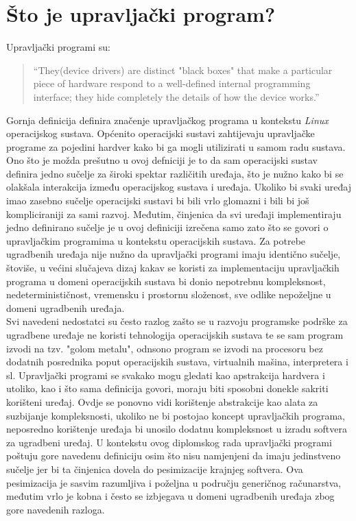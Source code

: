 \section{Što je upravljački program?}
Upravljački programi su\cite{linuxDeviceDrivers}:
\begin{quote}
    ``They(device drivers) are distinct "black boxes" that make a particular piece of hardware respond to a well-defined internal programming interface; they hide completely the details of how the device works.''
\end{quote}
Gornja definicija definira značenje upravljačkog programa u kontekstu \textit{Linux} operacijskog sustava. Općenito operacijski sustavi zahtijevaju upravljačke programe za pojedini hardver kako bi ga mogli utilizirati u samom radu sustava. Ono što je možda prešutno u ovoj defniciji je to da sam operacijski sustav definira jedno sučelje za široki spektar različitih uređaja, što je nužno kako bi se olakšala interakcija između operacijskog sustava i uređaja. Ukoliko bi svaki uređaj imao zasebno sučelje operacijski sustavi bi bili vrlo glomazni i bili bi još kompliciraniji za sami razvoj. Međutim, činjenica da svi uređaji implementiraju jedno definirano sučelje je u ovoj definiciji izrečena samo zato što se govori o upravljačkim programima u kontekstu operacijskih sustava. Za potrebe ugradbenih uređaja nije nužno da upravljački programi imaju identično sučelje, štoviše, u većini slučajeva dizaj kakav se koristi za implementaciju upravljačkih programa u domeni operacijskih sustava bi donio nepotrebnu kompleksnost, nedeterminističnost, vremensku i prostornu složenost, sve odlike nepoželjne u domeni ugradbenih uređaja. \\
Svi navedeni nedostatci su često razlog zašto se u razvoju programske podrške za ugradbene uređaje ne koristi tehnologija operacijskih sustava te se sam program izvodi na tzv. "golom metalu", odnsono program se izvodi na procesoru bez dodatnih posrednika poput operacijskih sustava, virtualnih mašina, interpretera i sl. Upravljački programi se svakako mogu gledati kao apstrakcija hardvera i utoliko, kao i što sama definicija govori, moraju biti sposobni donekle sakriti korišteni uređaj. Ovdje se ponovno vidi korištenje abstrakcije kao alata za suzbijanje kompleksnosti, ukoliko ne bi postojao koncept upravljačkih programa, neposredno korištenje uređaja bi unosilo dodatnu kompleksnost u izradu softvera za ugradbeni uređaj. U kontekstu ovog diplomskog rada upravljački programi poštuju gore navedenu definiciju osim što nisu namjenjeni da imaju jedinstveno sučelje jer bi ta činjenica dovela do pesimizacije krajnjeg softvera. Ova pesimizacija je sasvim razumljiva i poželjna u području generičnog računarstva, međutim vrlo je kobna i često se izbjegava u domeni ugradbenih uređaja zbog gore navedenih razloga. 
\pagebreak

